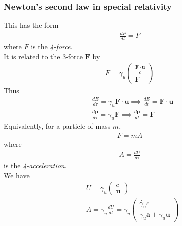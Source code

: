 \documentclass[a4paper]{article}
\begin{document}
\subsubsection{Newton's second law in special relativity}
This has the form
\begin{equation*}
\begin{aligned}
\frac{dP}{dt} = F
\end{aligned}
\end{equation*}
where $F$ is the \emph{4-force}.\\
It is related to the 3-force $\mathbf{F}$ by
\begin{equation*}
\begin{aligned}
F=\gamma_u \left(
\begin{array}{ll}
\frac{\mathbf{F}\cdot\mathbf{u}}{c}\\
\mathbf{F}
\end{array}\right)
\end{aligned}
\end{equation*}
Thus
\begin{equation*}
\begin{aligned}
&\frac{dE}{d\tau} = \gamma_u \mathbf{F}\cdot\mathbf{u} \implies \frac{dE}{dt} = \mathbf{F}\cdot\mathbf{u}\\
&\frac{d\mathbf{p}}{d\tau} = \gamma_u \mathbf{F} \implies \frac{d\mathbf{p}}{dt} = \mathbf{F}
\end{aligned}
\end{equation*}
Equivalently, for a particle of mass $m$,
\begin{equation*}
\begin{aligned}
F=mA
\end{aligned}
\end{equation*}
where
\begin{equation*}
\begin{aligned}
A=\frac{dU}{d\tau}
\end{aligned}
\end{equation*}
is the \emph{4-acceleration}.\\
We have
\begin{equation*}
\begin{aligned}
&U=\gamma_u \left(
\begin{array}{ll}
c\\
\mathbf{u}
\end{array}\right)\\
&A = \gamma_u \frac{dU}{dt}=\gamma_u \left(
\begin{array}{ll}
\dot{\gamma_u}c\\
\gamma_u\mathbf{a}+\dot{\gamma_u}\mathbf{u}
\end{array}\right)
\end{aligned}
\end{equation*}
\end{document}
